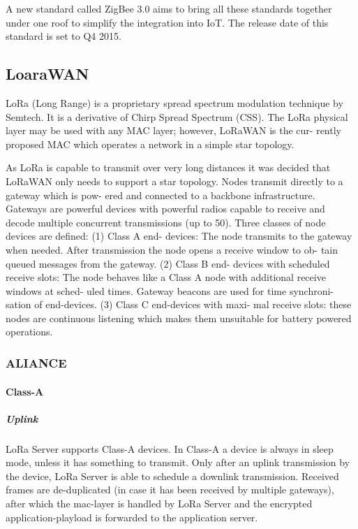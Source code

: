 A new standard called ZigBee 3.0 aims to bring all these standards together under one roof to simplify the integration into IoT.
The release date of this standard is set to Q4 2015.

\subsection{LoaraWAN}


LoRa (Long Range) is a proprietary spread spectrum
modulation technique by Semtech. It is a derivative of Chirp
Spread Spectrum (CSS). The LoRa physical layer may be
used with any MAC layer; however, LoRaWAN is the cur-
rently proposed MAC which operates a network in a simple
star topology. 

As LoRa is capable to transmit over very long distances
it was decided that LoRaWAN only needs to support a star
topology. Nodes transmit directly to a gateway which is pow-
ered and connected to a backbone infrastructure. Gateways
are powerful devices with powerful radios capable to receive
and decode multiple concurrent transmissions (up to 50).
Three classes of node devices are defined: (1) Class A end-
devices: The node transmits to the gateway when needed.
After transmission the node opens a receive window to ob-
tain queued messages from the gateway. (2) Class B end-
devices with scheduled receive slots: The node behaves like
a Class A node with additional receive windows at sched-
uled times. Gateway beacons are used for time synchroni-
sation of end-devices. (3) Class C end-devices with maxi-
mal receive slots: these nodes are continuous listening which
makes them unsuitable for battery powered operations.


\subsubsection{ALIANCE}


\paragraph{Class-A}

\subparagraph{Uplink}
LoRa Server supports Class-A devices.
In Class-A a device is always in sleep mode,
	unless it has something to transmit.
Only after an uplink transmission by the device,
	LoRa Server is able to schedule a downlink transmission.
Received frames are de-duplicated (in case it has been received by multiple gateways),
	after which the mac-layer is handled by LoRa Server and the encrypted application-playload is forwarded to the application server.

